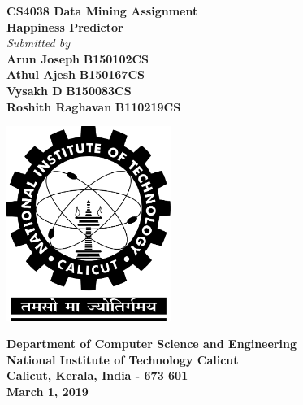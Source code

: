 \documentclass[twocolumn]{article}
\date{}
\begin{document}
\begin{titlepage}
\begin{center}
\vspace{1cm}

\Large
\textbf{CS4038 Data Mining Assignment}\\
\vspace{0.5cm}
\textbf{Happiness Predictor}\\
\vspace{0.5cm}
\emph{Submitted by}\\        
\vspace{0.5cm}
\large
\textbf{Arun Joseph} \hspace{0.75cm}    
\textbf{B150102CS}\\
\textbf{Athul Ajesh} \hspace{0.75cm}    
\textbf{B150167CS}\\
\textbf{Vysakh D} \hspace{0.75cm}    
\textbf{B150083CS}\\
\textbf{Roshith Raghavan} \hspace{0.75cm}
\textbf{B110219CS}\\

\vspace{.5cm}
\begin{center}
 \includegraphics[width=0.4\textwidth]{nitc-logo.png}
\end{center}
\vspace{0.8cm}
\textbf{Department of Computer Science and Engineering}\\
\textbf{National Institute of Technology Calicut}\\
\textbf{Calicut, Kerala, India - 673 601}\\
\vspace{0.8cm}
\textbf{March 1, 2019}
\end{center}
\end{titlepage}
\end{document}
